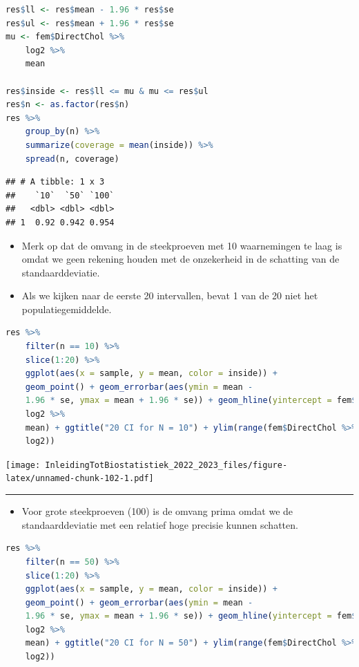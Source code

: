 \documentclass[
  12pt,dutch,coursenotes]{book}
\providecommand{\tightlist}{%
  \setlength{\itemsep}{0pt}\setlength{\parskip}{0pt}}
\begin{document}
\begin{lstlisting}[language=R]
res$ll <- res$mean - 1.96 * res$se
res$ul <- res$mean + 1.96 * res$se
mu <- fem$DirectChol %>%
    log2 %>%
    mean

res$inside <- res$ll <= mu & mu <= res$ul
res$n <- as.factor(res$n)
res %>%
    group_by(n) %>%
    summarize(coverage = mean(inside)) %>%
    spread(n, coverage)
\end{lstlisting}

\begin{lstlisting}
## # A tibble: 1 x 3
##    `10`  `50` `100`
##   <dbl> <dbl> <dbl>
## 1  0.92 0.942 0.954
\end{lstlisting}

\begin{itemize}
\item
  Merk op dat de omvang in de steekproeven met 10 waarnemingen te laag is omdat we geen rekening houden met de onzekerheid in de schatting van de standaarddeviatie.
\item
  Als we kijken naar de eerste 20 intervallen, bevat 1 van de 20 niet het populatiegemiddelde.
\end{itemize}

\begin{lstlisting}[language=R]
res %>%
    filter(n == 10) %>%
    slice(1:20) %>%
    ggplot(aes(x = sample, y = mean, color = inside)) +
    geom_point() + geom_errorbar(aes(ymin = mean -
    1.96 * se, ymax = mean + 1.96 * se)) + geom_hline(yintercept = fem$DirectChol %>%
    log2 %>%
    mean) + ggtitle("20 CI for N = 10") + ylim(range(fem$DirectChol %>%
    log2))
\end{lstlisting}

\texttt{[image: InleidingTotBiostatistiek\_2022\_2023\_files/figure-latex/unnamed-chunk-102-1.pdf]}

\begin{center}\rule{0.5\linewidth}{0.5pt}\end{center}

\begin{itemize}
\tightlist
\item
  Voor grote steekproeven (100) is de omvang prima omdat we de standaarddeviatie met een relatief hoge precisie kunnen schatten.
\end{itemize}

\begin{lstlisting}[language=R]
res %>%
    filter(n == 50) %>%
    slice(1:20) %>%
    ggplot(aes(x = sample, y = mean, color = inside)) +
    geom_point() + geom_errorbar(aes(ymin = mean -
    1.96 * se, ymax = mean + 1.96 * se)) + geom_hline(yintercept = fem$DirectChol %>%
    log2 %>%
    mean) + ggtitle("20 CI for N = 50") + ylim(range(fem$DirectChol %>%
    log2))
\end{lstlisting}
\end{document}
